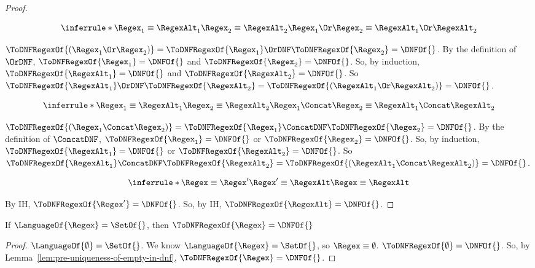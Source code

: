 \documentclass[acmsmall,screen]{acmart}
\begin{document}
\begin{proof}
  \begin{case}
    \[
      \inferrule*
      {
        \Regex_1 \equiv \RegexAlt_1\\
        \Regex_2 \equiv \RegexAlt_2
      }
      {
        \Regex_1 \Or \Regex_2 \equiv \RegexAlt_1 \Or \RegexAlt_2
      }
    \]

    $\ToDNFRegexOf{(\Regex_1 \Or \Regex_2)} =
    \ToDNFRegexOf{\Regex_1} \OrDNF \ToDNFRegexOf{\Regex_2} = \DNFOf{}$.
    By the definition of $\OrDNF$, $\ToDNFRegexOf{\Regex_1} = \DNFOf{}$ and
    $\ToDNFRegexOf{\Regex_2} = \DNFOf{}$.
    So, by induction, $\ToDNFRegexOf{\RegexAlt_1} = \DNFOf{}$ and
    $\ToDNFRegexOf{\RegexAlt_2} = \DNFOf{}$.
    So $\ToDNFRegexOf{\RegexAlt_1} \OrDNF \ToDNFRegexOf{\RegexAlt_2} =
    \ToDNFRegexOf{(\RegexAlt_1 \Or \RegexAlt_2)} = \DNFOf{}$.
  \end{case}

  \begin{case}
    \[
      \inferrule*
      {
        \Regex_1 \equiv \RegexAlt_1\\
        \Regex_2 \equiv \RegexAlt_2
      }
      {
        \Regex_1 \Concat \Regex_2 \equiv \RegexAlt_1 \Concat \RegexAlt_2
      }
    \]

    $\ToDNFRegexOf{(\Regex_1 \Concat \Regex_2)} =
    \ToDNFRegexOf{\Regex_1} \ConcatDNF \ToDNFRegexOf{\Regex_2} = \DNFOf{}$.
    By the definition of $\ConcatDNF$, $\ToDNFRegexOf{\Regex_1} = \DNFOf{}$ or
    $\ToDNFRegexOf{\Regex_2} = \DNFOf{}$.
    So, by induction, $\ToDNFRegexOf{\RegexAlt_1} = \DNFOf{}$ or
    $\ToDNFRegexOf{\RegexAlt_2} = \DNFOf{}$.
    So $\ToDNFRegexOf{\RegexAlt_1} \ConcatDNF \ToDNFRegexOf{\RegexAlt_2} =
    \ToDNFRegexOf{(\RegexAlt_1 \Concat \RegexAlt_2)} = \DNFOf{}$.
  \end{case}

  \begin{case}
    \[
      \inferrule*
      {
        \Regex \equiv \Regex'\\
        \Regex' \equiv \RegexAlt
      }
      {
        \Regex \equiv \RegexAlt
      }
    \]
  \end{case}

  By IH, $\ToDNFRegexOf{\Regex'} = \DNFOf{}$.
  So, by IH, $\ToDNFRegexOf{\RegexAlt} = \DNFOf{}$.
\end{proof}

\begin{mylemma}
  \label{lem:uniqueness-of-empty-in-dnf}
  If $\LanguageOf{\Regex} = \SetOf{}$, then $\ToDNFRegexOf{\Regex} = \DNFOf{}$
\end{mylemma}
\begin{proof}
  $\LanguageOf{\emptyset} = \SetOf{}$.
  We know $\LanguageOf{\Regex} = \SetOf{}$, so $\Regex \equiv \emptyset$.
  $\ToDNFRegexOf{\emptyset} = \DNFOf{}$.
  So, by Lemma~\ref{lem:pre-uniqueness-of-empty-in-dnf},
  $\ToDNFRegexOf{\Regex} = \DNFOf{}$.
\end{proof}
\end{document}
